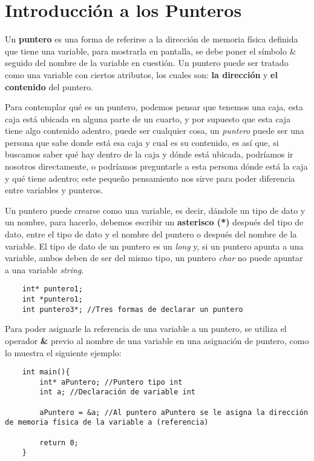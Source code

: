 \section{Introducción a los Punteros}
\hspace{0.55cm}Un \textbf{puntero} es una forma de referirse a la dirección de memoria física definida que tiene una variable, para mostrarla en pantalla, se debe poner el símbolo \& seguido del nombre de la variable en cuestión. Un puntero puede ser tratado como una variable con ciertos atributos, los cuales son: \textbf{la dirección} y \textbf{el contenido} del puntero.

Para contemplar qué es un puntero, podemos pensar que tenemos una caja, esta caja está ubicada en alguna parte de un cuarto, y por supuesto que esta caja tiene algo contenido adentro, puede ser cualquier cosa, un \textit{puntero} puede ser una persona que sabe donde está esa caja y cual es su contenido, es así que, si buscamos saber qué hay dentro de la caja y dónde está ubicada, podríamos ir nosotros directamente, o podríamos preguntarle a esta persona dónde está la caja y qué tiene adentro; este pequeño pensamiento nos sirve para poder diferencia entre variables y punteros.

Un puntero puede crearse como una variable, es decir, dándole un tipo de dato y un nombre, para hacerlo, debemos escribir un \textbf{asterisco (*)} después del tipo de dato, entre el tipo de dato y el nombre del puntero o después del nombre de la variable. El tipo de dato de un puntero es un \textit{long} y, si un puntero apunta a una variable, ambos deben de ser del mismo tipo, un puntero \textit{char} no puede apuntar a una variable \textit{string}.
\begin{lstlisting}
    int* puntero1;
    int *puntero1;
    int puntero3*; //Tres formas de declarar un puntero
\end{lstlisting}

Para poder asignarle la referencia de una variable a un puntero, se utiliza el operador \textbf{\&} previo al nombre de una variable en una asignación de puntero, como lo muestra el siguiente ejemplo:
\begin{lstlisting}
    int main(){
        int* aPuntero; //Puntero tipo int
        int a; //Declaración de variable int
        
        aPuntero = &a; //Al puntero aPuntero se le asigna la dirección de memoria física de la variable a (referencia)
    
        return 0;
    }
\end{lstlisting}

